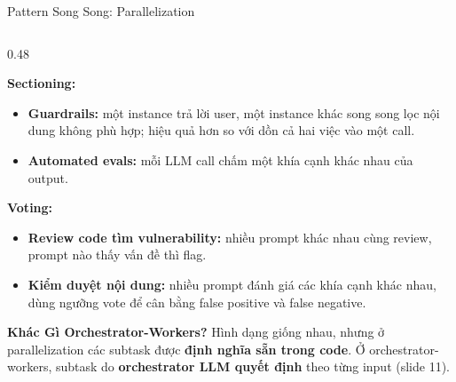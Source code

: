 \documentclass[aspectratio=1610,10pt,xcolor={table}]{beamer}
\begin{document}
\begin{frame}{Pattern Song Song: Parallelization}
\begin{columns}[t]
    \begin{column}{0.48\textwidth}
      \begin{tcolorbox}[usecase,title={Use case}]
        \scriptsize
        \textbf{Sectioning:}
        \begin{itemize}\scriptsize
          \item \textbf{Guardrails:} một instance trả lời user, một instance khác song song lọc nội dung không phù hợp; hiệu quả hơn so với dồn cả hai việc vào một call.
          \item \textbf{Automated evals:} mỗi LLM call chấm một khía cạnh khác nhau của output.
        \end{itemize}
        \textbf{Voting:}
        \begin{itemize}\scriptsize
          \item \textbf{Review code tìm vulnerability:} nhiều prompt khác nhau cùng review, prompt nào thấy vấn đề thì flag.
          \item \textbf{Kiểm duyệt nội dung:} nhiều prompt đánh giá các khía cạnh khác nhau, dùng ngưỡng vote để cân bằng false positive và false negative.
        \end{itemize}
      \end{tcolorbox}
      \begin{alertblock}{\textbf{Khác Gì Orchestrator-Workers?}}
        \scriptsize Hình dạng giống nhau, nhưng ở parallelization các subtask được \textbf{định nghĩa sẵn trong code}. Ở orchestrator-workers, subtask do \textbf{orchestrator LLM quyết định} theo từng input (slide 11).
      \end{alertblock}
    \end{column}
  \end{columns}
\end{frame}
\end{document}
